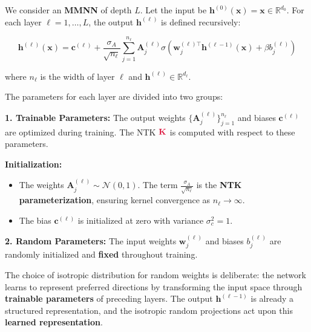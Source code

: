 \documentclass[a4paper]{article}
\newcommand{\Kop}{\textcolor{kernelcolor}{\mathbf{K}}}
\newcommand{\Kop}{\textcolor{kernelcolor}{\mathbf{K}}}
\newcommand{\Kop}{\textcolor{kernelcolor}{\mathbf{K}}}
\theoremstyle{plain}
\theoremstyle{definition}
\theoremstyle{remark}
\begin{document}
\begin{tcolorbox}[colback=yellow!15,colframe=yellow!80!black,title={\textbf{Definition: MMNN Architecture}},enhanced,drop shadow,boxrule=2pt]
We consider an \textbf{MMNN} of depth $L$. Let the input be $\bm{h}^{(0)}(\bm{x}) = \bm{x} \in \mathbb{R}^{d_0}$. For each layer $\ell = 1, \dots, L$, the output $\bm{h}^{(\ell)}$ is defined recursively:

\begin{equation}
    \bm{h}^{(\ell)}(\bm{x}) = \bm{c}^{(\ell)} + \frac{\sigma_A}{\sqrt{n_\ell}} \sum_{j=1}^{n_\ell} \bm{A}_j^{(\ell)} \sigma\left(\bm{w}_j^{(\ell)\top} \bm{h}^{(\ell-1)}(\bm{x}) + \beta b_j^{(\ell)}\right)
\end{equation}

where $n_\ell$ is the width of layer $\ell$ and $\bm{h}^{(\ell)} \in \mathbb{R}^{d_\ell}$.
\end{tcolorbox}



\begin{tcolorbox}[colback=blue!15,colframe=blue!80!black,title={\textbf{Remark : Parameter Classification}},enhanced,drop shadow,boxrule=2pt]
The parameters for each layer are divided into two groups:

\textbf{1. Trainable Parameters:} The output weights $\{\bm{A}_j^{(\ell)}\}_{j=1}^{n_\ell}$ and biases $\bm{c}^{(\ell)}$ are optimized during training. The NTK $\Kop $ is computed with respect to these parameters.

\textbf{Initialization:}
\begin{itemize}
\item The weights $\bm{A}_j^{(\ell)} \sim \mathcal{N}(0, 1)$. The term $\frac{\sigma_A}{\sqrt{n_\ell}}$ is the \textbf{NTK parameterization}, ensuring kernel convergence as $n_\ell \to \infty$.
\item The bias $\bm{c}^{(\ell)}$ is initialized at zero with variance $\sigma_c^2 = 1$.
\end{itemize}

\textbf{2. Random Parameters:} The input weights $\bm{w}_j^{(\ell)}$ and biases $b_j^{(\ell)}$ are randomly initialized and \textbf{fixed} throughout training.
\end{tcolorbox}





\begin{tcolorbox}[colback=green!5,colframe=green!80!black,title={\textbf{Insight : Architectural Philosophy}},enhanced,drop shadow,boxrule=2pt]
The choice of isotropic distribution for random weights is deliberate: the network learns to represent preferred directions by transforming the input space through \textbf{trainable parameters} of preceding layers. The output $\bm{h}^{(\ell-1)}$ is already a structured representation, and the isotropic random projections act upon this \textbf{learned representation}.
\end{tcolorbox}
\end{document}
